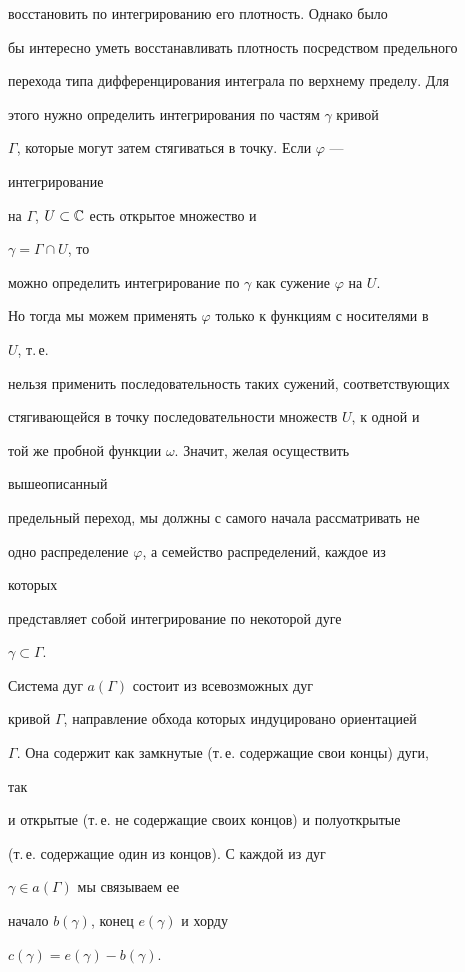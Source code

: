 восстановить по интегрированию его плотность. Однако было 


бы интересно уметь восстанавливать плотность посредством предельного 


перехода типа дифференцирования интеграла по верхнему пределу. Для 


этого нужно определить интегрирования по частям $\gamma$ кривой 


$\Gamma$, которые могут затем стягиваться в точку. Если $\varphi$ --- 


интегрирование 


на $\Gamma$, $U\subset\Bbb C$ есть открытое множество и 


$\gamma=\Gamma\cap U$, то 


можно определить интегрирование по $\gamma$ как сужение $\varphi$ на $U$. 


Но тогда мы можем применять $\varphi$ только к функциям с носителями в 


$U$, т.\,е. 


нельзя применить последовательность таких сужений, соответствующих 


стягивающейся в точку последовательности множеств $U$, к одной и 


той же пробной функции $\omega$. Значит, желая осуществить 


вышеописанный 


предельный переход, мы должны с самого начала рассматривать не 


одно распределение $\varphi$, а семейство распределений, каждое из 


которых 


представляет собой интегрирование по некоторой дуге 


$\gamma\subset\Gamma$. 


 


\begin{defn} Система дуг $a(\Gamma)$ состоит из всевозможных дуг 


кривой $\Gamma$, направление обхода которых индуцировано ориентацией 


$\Gamma$. Она содержит как замкнутые (т.\,е. содержащие свои концы) дуги, 


так 


и открытые (т.\,е. не содержащие своих концов) и полуоткрытые 


(т.\,е. содержащие один из концов). С каждой из дуг 


$\gamma\in a(\Gamma)$ мы связываем ее 


начало $b(\gamma)$, конец $e(\gamma)$ и хорду 


$c(\gamma)=e(\gamma)-b(\gamma)$. 


\end{defn} 


